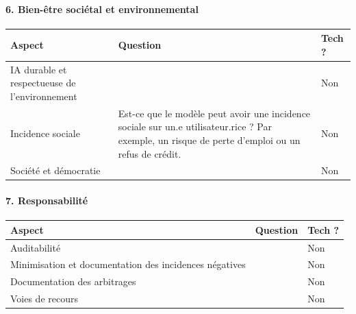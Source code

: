 \documentclass[10pt, french, a4paper]{article}
\begin{document}
\paragraph{6. Bien-être sociétal et environnemental}

\begin{center}
  \begin{tabular}{ |p{4cm}|p{6cm}|p{2cm}| } 
    \hline
    Aspect & Question & Tech ? \\
    \hline
    \hline
    IA durable et respectueuse de l’environnement &  & Non \\
    \hline
    Incidence sociale & Est-ce que le modèle peut avoir une incidence sociale sur un.e utilisateur.rice ? Par exemple, un risque de perte d'emploi ou un refus de crédit. & Non \\
    \hline
    Société et démocratie &  & Non \\
    \hline
    
  \end{tabular}
\end{center}

\paragraph{7. Responsabilité}

\begin{center}
  \begin{tabular}{ |p{4cm}|p{6cm}|p{2cm}| } 
    \hline
    Aspect & Question & Tech ? \\
    \hline
    \hline
    Auditabilité &  & Non \\
    \hline
    Minimisation et documentation des incidences négatives &  & Non \\
    \hline
    Documentation des arbitrages &  & Non \\
    \hline
    Voies de recours &  & Non \\
    \hline
    
  \end{tabular}
\end{center}
\end{document}

